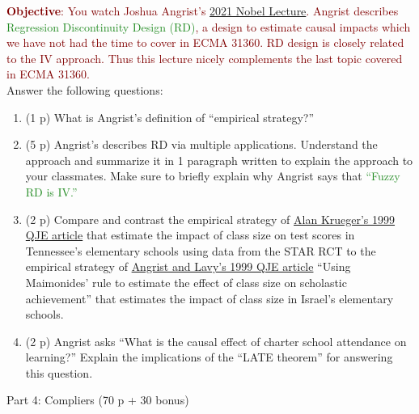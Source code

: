 \documentclass{article}
\begin{document}
\noindent \textcolor{Maroon}{\textbf{Objective}: You watch Joshua Angrist's \href{https://www.youtube.com/watch?v=SEX8FC7UHbU&t=131s}{2021 Nobel Lecture}. Angrist describes \textcolor{ForestGreen}{Regression Discontinuity Design (RD)}, a design to estimate causal impacts which we have not had the time to cover in ECMA 31360. RD design is closely related to the IV approach. Thus this lecture nicely complements the last topic covered in ECMA 31360.}\\

Answer the following questions:
\begin{enumerate}[label=\textbf{Q\arabic{enumi}}.,ref=Q\arabic{enumi}, wide=0pt, itemsep=0em, topsep=5pt, labelindent=0pt, resume]

\item (1 p) What is Angrist's definition of ``empirical strategy?''
\item (5 p) Angrist's describes RD via multiple applications. Understand the approach and summarize it in 1 paragraph written to explain the approach to your classmates. Make sure to briefly explain why Angrist says that \textcolor{ForestGreen}{``Fuzzy RD is IV.''} 
\item (2 p) Compare and contrast the empirical strategy of \href{https://www.jstor.org/stable/2587015}{Alan Krueger's 1999 QJE article} that estimate the impact of class size on test scores in Tennessee's elementary schools using data from the STAR RCT to the empirical strategy of \href{https://www.jstor.org/stable/2587016}{Angrist and Lavy's 1999 QJE article} ``Using Maimonides' rule to estimate the effect of class size on scholastic achievement'' that estimates the impact of class size in Israel's elementary schools.
\item (2 p) Angrist asks ``What is the causal effect of charter school attendance on learning?'' Explain the implications of the ``LATE theorem'' for answering this question.
\end{enumerate}

\begin{center}
{\LARGE Part 4: Compliers (70 p + 30 bonus)}
\end{center}
\end{document}
